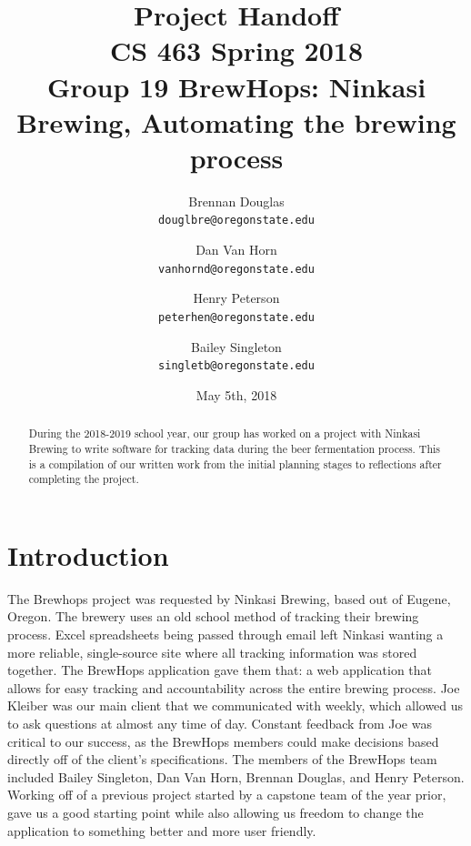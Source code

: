 \documentclass[draftclsnofoot,onecolumn,journal,letterpaper,compsoc,10pt]{IEEEtran}
\title{Project Handoff\\\large CS 463 Spring 2018\\Group 19 BrewHops: Ninkasi Brewing, Automating the brewing process}
\author{
    Brennan Douglas \\
    \texttt{douglbre@oregonstate.edu} \\
    \and
    Dan Van Horn \\
    \texttt{vanhornd@oregonstate.edu} \\
    \and
    Henry Peterson \\
    \texttt{peterhen@oregonstate.edu} \\
    \and
    Bailey Singleton \\
    \texttt{singletb@oregonstate.edu} \\
}
\date{May 5th, 2018}
\begin{document}
\begin{titlingpage}
    \maketitle
    \begin{abstract}
        During the 2018-2019 school year, our group has worked on a project with Ninkasi Brewing to write software for tracking data during the beer fermentation process. This is a compilation of our written work from the initial planning stages to reflections after completing the project.
    \end{abstract}
    \pagebreak
    \tableofcontents
\end{titlingpage}

\section{Introduction}
    The Brewhops project was requested by Ninkasi Brewing, based out of Eugene, Oregon. The brewery uses an old school method of tracking their brewing process. Excel spreadsheets being passed through email left Ninkasi wanting a more reliable, single-source site where all tracking information was stored together. The BrewHops application gave them that: a web application that allows for easy tracking and accountability across the entire brewing process. Joe Kleiber was our main client that we communicated with weekly, which allowed us to ask questions at almost any time of day. Constant feedback from Joe was critical to our success, as the BrewHops members could make decisions based directly off of the client's specifications. The members of the BrewHops team included Bailey Singleton, Dan Van Horn, Brennan Douglas, and Henry Peterson. Working off of a previous project started by a capstone team of the year prior, gave us a good starting point while also allowing us freedom to change the application to something better and more user friendly. 


\newpage
\end{document}
